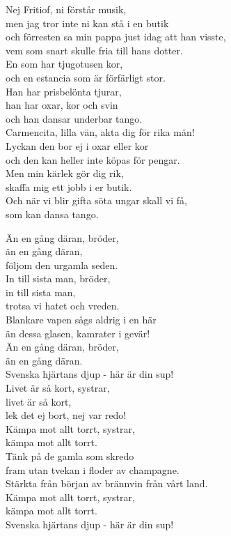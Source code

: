 \documentclass[a6paper, 10pt, twoside]{article}
\begin{document}
\begin{lyrics}
\newpage
\noindent
Nej Fritiof, ni förstår musik, \\
men jag tror inte ni kan stå i en butik \\
och förresten sa min pappa just idag att han visste, \\
vem som snart skulle fria till hans dotter. \\
En som har tjugotusen kor, \\
och en estancia som är förfärligt stor. \\
Han har prisbelönta tjurar, \\
han har oxar, kor och svin \\
och han dansar underbar tango. 
\vspace{5pt}\\
Carmencita, lilla vän, akta dig för rika män! \\
Lyckan den bor ej i oxar eller kor \\
och den kan heller inte köpas för pengar. \\
Men min kärlek gör dig rik, \\
skaffa mig ett jobb i er butik. \\
Och när vi blir gifta söta ungar skall vi få, \\
som kan dansa tango.
\end{lyrics}
	    
\noindent
\begin{center}
\end{center}
\begin{lyrics}
Än en gång däran, bröder,\\
än en gång däran,\\
följom den urgamla seden.\\
In till sista man, bröder,\\
in till sista man,\\
trotsa vi hatet och vreden. \\
Blankare vapen sågs aldrig i en här\\
än dessa glasen, kamrater i gevär!\\
Än en gång däran, bröder,\\
än en gång däran.\\
Svenska hjärtans djup - här är din sup!
\vspace{5pt}\\
Livet är så kort, systrar,\\
livet är så kort,\\
lek det ej bort, nej var redo!\\
Kämpa mot allt torrt, systrar,\\
kämpa mot allt torrt.\\
Tänk på de gamla som skredo\\
fram utan tvekan i floder av champagne.\\
Stärkta från början av brännvin från vårt land.\\
Kämpa mot allt torrt, systrar,\\
kämpa mot allt torrt.\\
Svenska hjärtans djup - här är din sup! 
\end{lyrics}
\end{document}
